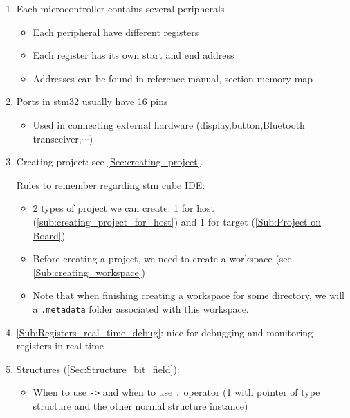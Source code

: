 \begin{enumerate}
    \item Each microcontroller contains several peripherals
    
    \begin{itemize}
        \item Each peripheral have different registers
        
        \item Each register has its own start and end address
        
        \item Addresses can be found in reference manual, section memory map
    \end{itemize}
    
\item Ports in stm32 usually have 16 pins

\begin{itemize}
    \item Used in connecting external hardware (display,button,Bluetooth transceiver,$\cdots$)
\end{itemize}

\item  Creating project: see \autoref{Sec:creating_project}.

\underline{Rules to remember regarding stm cube IDE:} 

\begin{itemize}

    \item  2 types of project we can create: 1 for host (\ref{sub:creating_project_for_host}) and 1 for target (\ref{Sub:Project on Board})

    \item Before creating a project, we need to create a workspace (see \ref{Sub:creating_workspace})
    
    \item Note that when finishing creating a workspace for some directory, we will a \verb|.metadata| folder associated with this workspace.


\end{itemize}

\item \ref{Sub:Registers_real_time_debug}: nice for debugging and monitoring registers in real time  

\item Structures (\autoref{Sec:Structure_bit_field}):

\begin{itemize}
    \item When to use \verb|->| and when to use \verb|.| operator (1 with pointer of type structure and the other normal structure instance)
\end{itemize}
    

\end{enumerate}
